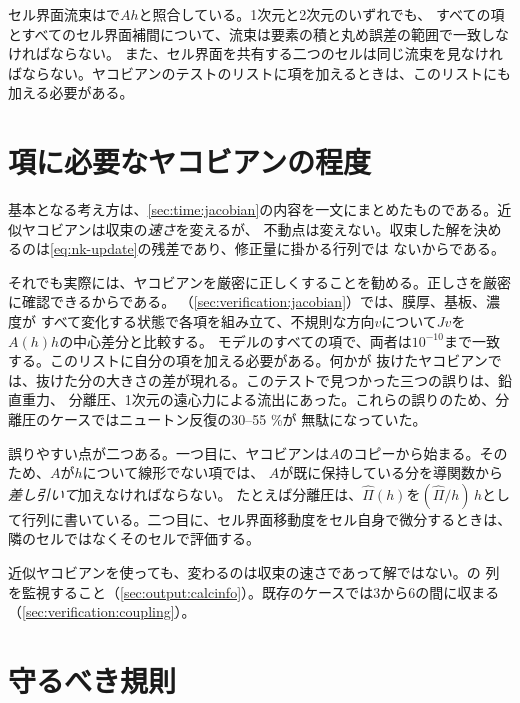 セル界面流束はで$A h$と照合している。1次元と2次元のいずれでも、
すべての項とすべてのセル界面補間について、流束は要素の積と丸め誤差の範囲で一致しなければならない。
また、セル界面を共有する二つのセルは同じ流束を見なければならない。ヤコビアンのテストのリストに項を加えるときは、このリストにも加える必要がある。

\section{項に必要なヤコビアンの程度}
\label{sec:extending:jacobian}

基本となる考え方は、\cref{sec:time:jacobian}の内容を一文にまとめたものである。近似ヤコビアンは収束の\emph{速さ}を変えるが、
不動点は変えない。収束した解を決めるのは\cref{eq:nk-update}の残差であり、修正量に掛かる行列では
ないからである。

それでも実際には、ヤコビアンを厳密に正しくすることを勧める。正しさを厳密に確認できるからである。
（\cref{sec:verification:jacobian}）では、膜厚、基板、濃度が
すべて変化する状態で各項を組み立て、不規則な方向$v$について$J v$を$A(h)h$の中心差分と比較する。
モデルのすべての項で、両者は$10^{-10}$まで一致する。このリストに自分の項を加える必要がある。何かが
抜けたヤコビアンでは、抜けた分の大きさの差が現れる。このテストで見つかった三つの誤りは、鉛直重力、
分離圧、1次元の遠心力による流出にあった。これらの誤りのため、分離圧のケースではニュートン反復の30--55 \%が
無駄になっていた。

誤りやすい点が二つある。一つ目に、ヤコビアンは$A$のコピーから始まる。そのため、$A$が$h$について線形でない項では、
$A$が既に保持している分を導関数から\emph{差し引いて}加えなければならない。
たとえば分離圧は、$\hat\Pi(h)$を$(\hat\Pi/h)\,h$として行列に書いている。二つ目に、セル界面移動度をセル自身で微分するときは、
隣のセルではなくそのセルで評価する。

近似ヤコビアンを使っても、変わるのは収束の速さであって解ではない。の
列を監視すること（\cref{sec:output:calcinfo}）。既存のケースでは3から6の間に収まる
（\cref{sec:verification:coupling}）。



\section{守るべき規則}
\label{sec:extending:rules}

